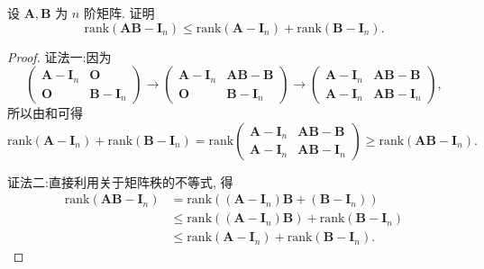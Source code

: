 \documentclass[../../main.tex]{subfiles}
\begin{document}
\begin{proposition}\label{proposition:矩阵与单位阵差相关不等式}
设 $\boldsymbol{A},\boldsymbol{B}$ 为 $n$ 阶矩阵. 证明
\[
\mathrm{rank}(\boldsymbol{AB} - \boldsymbol{I}_n) \leqslant \mathrm{rank}(\boldsymbol{A} - \boldsymbol{I}_n) + \mathrm{rank}(\boldsymbol{B} - \boldsymbol{I}_n).
\]
\end{proposition}
\begin{proof}
{\color{blue}证法一:}因为
\[
\begin{pmatrix} 
\boldsymbol{A} - \boldsymbol{I}_n & \boldsymbol{O} \\
\boldsymbol{O} & \boldsymbol{B} - \boldsymbol{I}_n 
\end{pmatrix} \to \begin{pmatrix} 
\boldsymbol{A} - \boldsymbol{I}_n & \boldsymbol{AB} - \boldsymbol{B} \\
\boldsymbol{O} & \boldsymbol{B} - \boldsymbol{I}_n 
\end{pmatrix} \to \begin{pmatrix} 
\boldsymbol{A} - \boldsymbol{I}_n & \boldsymbol{AB} - \boldsymbol{B} \\
\boldsymbol{A} - \boldsymbol{I}_n & \boldsymbol{AB} - \boldsymbol{I}_n 
\end{pmatrix},
\]
所以由和可得
\[
\mathrm{rank}(\boldsymbol{A} - \boldsymbol{I}_n) + \mathrm{rank}(\boldsymbol{B} - \boldsymbol{I}_n) = \mathrm{rank}\begin{pmatrix} 
\boldsymbol{A} - \boldsymbol{I}_n & \boldsymbol{AB} - \boldsymbol{B} \\
\boldsymbol{A} - \boldsymbol{I}_n & \boldsymbol{AB} - \boldsymbol{I}_n 
\end{pmatrix} \geqslant \mathrm{rank}(\boldsymbol{AB} - \boldsymbol{I}_n).
\]

{\color{blue}证法二:}直接利用关于矩阵秩的不等式, 得
\begin{align*}
\mathrm{rank}(\boldsymbol{AB} - \boldsymbol{I}_n) &= \mathrm{rank}((\boldsymbol{A} - \boldsymbol{I}_n)\boldsymbol{B} + (\boldsymbol{B} - \boldsymbol{I}_n)) \\
&\leqslant \mathrm{rank}((\boldsymbol{A} - \boldsymbol{I}_n)\boldsymbol{B}) + \mathrm{rank}(\boldsymbol{B} - \boldsymbol{I}_n) \\
&\leqslant \mathrm{rank}(\boldsymbol{A} - \boldsymbol{I}_n) + \mathrm{rank}(\boldsymbol{B} - \boldsymbol{I}_n).
\end{align*}
\end{proof}
\end{document}
